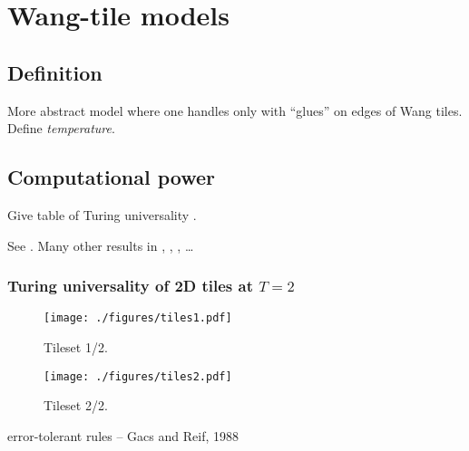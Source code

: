 
\section{Wang-tile models}

\subsection{Definition}
	
	More abstract model where one handles only with ``glues'' on edges of Wang tiles. Define {\em temperature}.

\subsection{Computational power}
	
	Give table of Turing universality \cite{cook_temp1}.
	
	See \cite{winfree_phd}. Many other results in \cite{cook_temp1}, \cite{stage_assembly}, \cite{square_lb}, \cite{square_ub} \ldots
	
	\subsubsection{Turing universality of 2D tiles at $T=2$}
		
		\begin{figure}[H]
		\begin{center}
			\texttt{[image: ./figures/tiles1.pdf]}
			\caption{Tileset 1/2.}
		\end{center}
		\end{figure}
		
		\begin{figure}[H]
		\begin{center}
			\texttt{[image: ./figures/tiles2.pdf]}
			\caption{Tileset 2/2.}
		\end{center}
		\end{figure}
	
	
	error-tolerant rules -- Gacs and Reif, 1988\\
